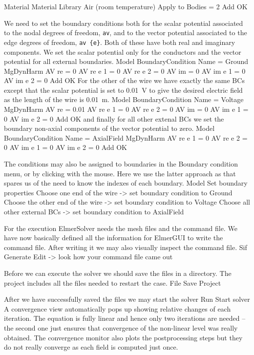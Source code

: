   Material
    Material Library
      Air (room temperature)
    Apply to Bodies = 2
    Add
    OK
\ttend

We need to set the boundary conditions both for the scalar potential associated to the nodal degrees of freedom, \texttt{av},
and to the vector potential associated to the edge degrees of freedom, \texttt{av \{e\}}.
Both of these have both real and imaginary components. 
We set the scalar potential only for the conductors and the vector potential for all external boundaries.
\ttbegin
Model
  BoundaryCondition
    Name = Ground 
    MgDynHarm
      AV re = 0
      AV re {e} 1 = 0
      AV re {e} 2 = 0
      AV im = 0
      AV im {e} 1 = 0
      AV im {e} 2 = 0
    Add
    OK
\ttend   
For the other of the wire we have exactly the same BCs except that the scalar potential is set to 0.01~V to give the desired
electric field as the length of the wire is 0.01~m. 
\ttbegin
Model
  BoundaryCondition
    Name = Voltage
    MgDynHarm
      AV re = 0.01
      AV re {e} 1 = 0
      AV re {e} 2 = 0
      AV im = 0
      AV im {e} 1 = 0
      AV im {e} 2 = 0
    Add
    OK
\ttend   
and finally for all other extenal BCs we set the boundary non-axial components of the vector potential to zero.
\ttbegin
Model
  BoundaryCondition
    Name = AxialField
    MgDynHarm
      AV re {e} 1 = 0
      AV re {e} 2 = 0
      AV im {e} 1 = 0
      AV im {e} 2 = 0
    Add
    OK
\ttend 


The conditions may also be assigned to boundaries in the Boundary condition menu, or 
by clicking with the mouse. Here we use the latter approach as that spares us of the 
need to know the indexes of each boundary.
\ttbegin
Model
  Set boundary properties
    Choose one end of the wire -> set boundary condition to Ground
    Choose the other end of the wire -> set boundary condition to Voltage
    Choose all other external BCs -> set boundary condition to AxialField
\ttend

For the execution 
ElmerSolver needs the mesh files and the command file. We have now basically defined
all the information for ElmerGUI to write the command file. After writing it we may also visually 
inspect the command file.
\ttbegin
Sif 
  Generate
  Edit -> look how your command file came out  
\ttend

Before we can execute the solver we should save the files in a directory. The project includes
all the files needed to restart the case.
\ttbegin
File 
  Save Project
\ttend

After we have successfully saved the files we may start the solver
\ttbegin
Run
  Start solver
\ttend
A convergence view automatically pops up showing relative changes of each iteration.
The equation is fully linear and hence only two iterations are needed -- the second 
one just ensures that convergence of the non-linear level was really obtained. 
The convergence monitor also plots the postprocessing steps but they do not really converge as each field is computed just once. 


